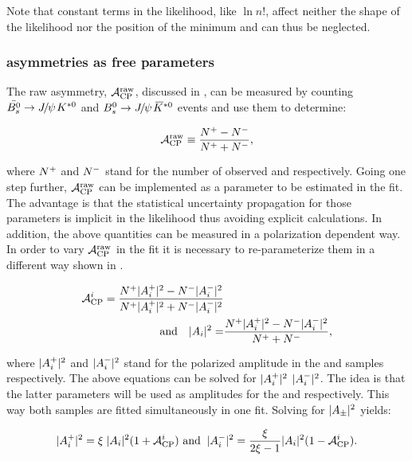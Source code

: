 \noindent Note that constant terms in the likelihood, like $\ln n!$, affect neither the shape of the likelihood nor the position of the minimum
and can thus be neglected.

\subsubsection{\CP asymmetries as free parameters}
\label{cp_assymetries_and_total_decay_rate}
The raw asymmetry, $\mathcal{A}_{\rm CP}^{\rm raw}$, discussed in , can be measured by counting
$\BsbarJpsiKst$ and $\BsJpsiKst$ events and use them to determine:

\begin{equation}
\mathcal{A}_{\rm CP}^{\text{raw}} \equiv \frac{{N^+} - {N^-}}{{N^+} + {N^-}},
\label{acp_mes}
\end{equation}

\noindent where ${N^+}$ and ${N^-}$ stand for the number of observed \BsbarJpsiKst and \BsJpsiKst respectively.
Going one step further, $\mathcal{A}_{\rm CP}^{\text{raw}}$ can be implemented as a parameter to be estimated in the fit. The advantage
is that the statistical uncertainty propagation for those parameters is implicit in the likelihood thus avoiding
explicit calculations. In addition, the above quantities can be measured in a polarization dependent way. In order
to vary $\mathcal{A}_{\rm CP}^{\text{raw}}$ in the fit it is necessary to re-parameterize them in a different way shown in .

\begin{align}
  \label{acp_param}
\mathcal{A}_{\rm CP}^{i} = \frac{{N^+}|{A}_{i}^+|^2 - {N^-}|{A}_{i}^-|^2}{{N^+}|{A}_{i}^+|^2 + {N^-}|{A}_{i}^-|^2 } & \\
\text{and} \quad |{A}_{i}|^2 = &\frac{ {N^+} |{A}_{i}^+|^2 - {N^-}|{A}_{i}^-|^2}{{N^+} + {N^-}},
\end{align}


\noindent where $|{A}_{i}^+|^2$ and $|{A}_{i}^-|^2$ stand for the polarized amplitude in the \BsbarJpsiKst
and \BsJpsiKst samples respectively. The above equations can be solved for $|{A}_{i}^+|^2$  $|{A}_{i}^-|^2$. The idea
is that the latter parameters will be used as amplitudes for the \BsbarJpsiKst and \BsJpsiKst \pdfs respectively.
This way both samples are fitted simultaneously in one fit. Solving  for $|{A}_{\pm}|^2$ yields:

\begin{equation}
|{A}_{i}^+|^2 = \xi \; |{A}_{i}|^2 (1+\mathcal{A}_{\rm CP}^{i}) \,\, \text{and}\;\; |{A}_{i}^-|^2 = \frac{\xi}{2\xi-1} |{A}_{i}|^2 (1-\mathcal{A}_{\rm CP}^{i}).
\label{acp_free}
\end{equation}

